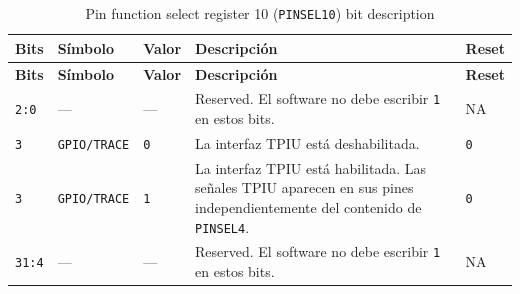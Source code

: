 \begin{longtable}{|>{\raggedright\arraybackslash}p{}|>{\raggedright\arraybackslash}p{}|>{\raggedright\arraybackslash}p{}|>{\raggedright\arraybackslash}p{}|>{\centering\arraybackslash}p{}|}
\caption{Pin function select register 10 (\texttt{PINSEL10}) bit description}\\
\hline
\textbf{Bits} & \textbf{Símbolo} & \textbf{Valor} & \textbf{Descripción} & \textbf{Reset} \\
\hline
\endfirsthead
\hline
\textbf{Bits} & \textbf{Símbolo} & \textbf{Valor} & \textbf{Descripción} & \textbf{Reset} \\
\hline
\endhead
\texttt{2:0} & --- & --- & Reserved. El software no debe escribir \texttt{1} en estos bits. & NA \\
\hline
\texttt{3} & \texttt{GPIO/TRACE} & \texttt{0} & La interfaz TPIU está deshabilitada. & \texttt{0} \\
\hline
\texttt{3} & \texttt{GPIO/TRACE} & \texttt{1} & La interfaz TPIU está habilitada. Las señales TPIU aparecen en sus pines independientemente del contenido de \texttt{PINSEL4}. & \texttt{0} \\
\hline
\texttt{31:4} & --- & --- & Reserved. El software no debe escribir \texttt{1} en estos bits. & NA \\
\hline
\end{longtable}


